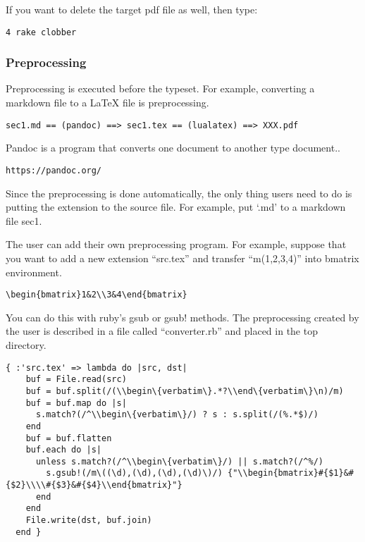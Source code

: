 \documentclass[
]{article}
\begin{document}
If you want to delete the target pdf file as well, then type:

\begin{verbatim}
4 rake clobber
\end{verbatim}

\hypertarget{preprocessing}{%
\subsubsection{Preprocessing}\label{preprocessing}}

Preprocessing is executed before the typeset. For example, converting a
markdown file to a LaTeX file is preprocessing.

\begin{verbatim}
sec1.md == (pandoc) ==> sec1.tex == (lualatex) ==> XXX.pdf
\end{verbatim}

Pandoc is a program that converts one document to another type
document..

\begin{verbatim}
https://pandoc.org/
\end{verbatim}

Since the preprocessing is done automatically, the only thing users need
to do is putting the extension to the source file. For example, put
`.md' to a markdown file sec1.

The user can add their own preprocessing program. For example, suppose
that you want to add a new extension ``src.tex'' and transfer
``m(1,2,3,4)'' into bmatrix environment.

\begin{verbatim}
\begin{bmatrix}1&2\\3&4\end{bmatrix}
\end{verbatim}

You can do this with ruby's gsub or gsub! methods. The preprocessing
created by the user is described in a file called ``converter.rb'' and
placed in the top directory.

\begin{verbatim}
{ :'src.tex' => lambda do |src, dst|
    buf = File.read(src)
    buf = buf.split(/(\\begin\{verbatim\}.*?\\end\{verbatim\}\n)/m)
    buf = buf.map do |s|
      s.match?(/^\\begin\{verbatim\}/) ? s : s.split(/(%.*$)/)
    end
    buf = buf.flatten
    buf.each do |s|
      unless s.match?(/^\\begin\{verbatim\}/) || s.match?(/^%/)
        s.gsub!(/m\((\d),(\d),(\d),(\d)\)/) {"\\begin{bmatrix}#{$1}&#{$2}\\\\#{$3}&#{$4}\\end{bmatrix}"}
      end
    end
    File.write(dst, buf.join)
  end }
\end{verbatim}
\end{document}

